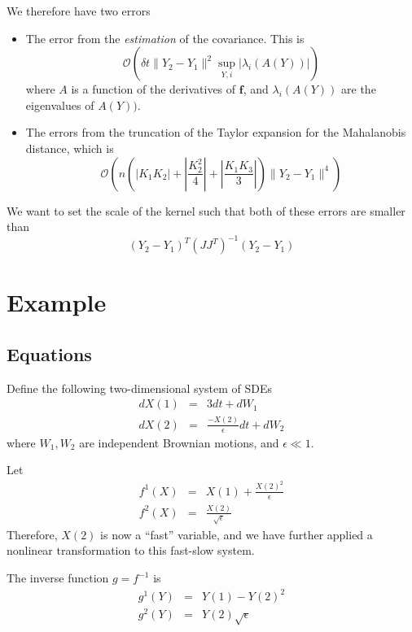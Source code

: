 \documentclass[12pt]{article}
\begin{document}
We therefore have two errors
\begin{itemize}
\item The error from the {\em estimation} of the covariance.
%
This is
$$\mathcal{O} \left( \delta t \| Y_2 - Y_1 \|^2 \sup_{Y, i} |\lambda_i(A(Y))| \right)$$
%
where $A$ is a function of the derivatives of $\mathbf{f}$, and $\lambda_i(A(Y))$ are the eigenvalues of $A(Y))$.

\item The errors from the truncation of the Taylor expansion for the Mahalanobis distance, which is 
$$\mathcal{O} \left(  n \left( \left| K_1 K_2 \right| + \left| \frac{ K_2^2}{4} \right|  + \left| \frac{K_1 K_3}{3} \right|  \right) \| Y_2 - Y_1 \| ^4  \right)$$
\end{itemize}

We want to set the scale of the kernel such that both of these errors are smaller than
\begin{equation}
(Y_2 - Y_1)^T (JJ^T)^{-1} (Y_2 - Y_1) 
\end{equation}

\section{Example}

\subsection{Equations}

Define the following two-dimensional system of SDEs
\begin{eqnarray}
dX(1) &=& 3 dt + dW_1 \\ 
dX(2) &=& \frac{-X(2)}{\epsilon} dt + dW_2 
\end{eqnarray}
where $W_1, W_2$ are independent Brownian motions, and $\epsilon \ll 1$.

Let
\begin{eqnarray}
f^1(X) &=& X(1) + \frac{ X(2)^2}{\epsilon} \\
f^2(X) &=& \frac{X(2)}{\sqrt{\epsilon}}
\end{eqnarray}
Therefore, $X(2)$ is now a ``fast'' variable, and we have further applied a nonlinear transformation to this fast-slow system. 

The inverse function $g = f^{-1}$ is
\begin{eqnarray}
g^1(Y) &=& Y(1) - Y(2)^2 \\
g^2(Y) &=& Y(2) \sqrt{\epsilon}
\end{eqnarray}
\end{document}
